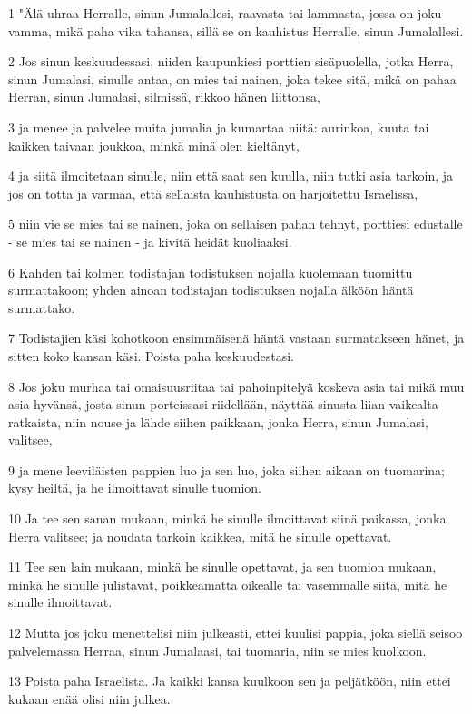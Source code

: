 \par 1 "Älä uhraa Herralle, sinun Jumalallesi, raavasta tai lammasta, jossa on joku vamma, mikä paha vika tahansa, sillä se on kauhistus Herralle, sinun Jumalallesi.
\par 2 Jos sinun keskuudessasi, niiden kaupunkiesi porttien sisäpuolella, jotka Herra, sinun Jumalasi, sinulle antaa, on mies tai nainen, joka tekee sitä, mikä on pahaa Herran, sinun Jumalasi, silmissä, rikkoo hänen liittonsa,
\par 3 ja menee ja palvelee muita jumalia ja kumartaa niitä: aurinkoa, kuuta tai kaikkea taivaan joukkoa, minkä minä olen kieltänyt,
\par 4 ja siitä ilmoitetaan sinulle, niin että saat sen kuulla, niin tutki asia tarkoin, ja jos on totta ja varmaa, että sellaista kauhistusta on harjoitettu Israelissa,
\par 5 niin vie se mies tai se nainen, joka on sellaisen pahan tehnyt, porttiesi edustalle - se mies tai se nainen - ja kivitä heidät kuoliaaksi.
\par 6 Kahden tai kolmen todistajan todistuksen nojalla kuolemaan tuomittu surmattakoon; yhden ainoan todistajan todistuksen nojalla älköön häntä surmattako.
\par 7 Todistajien käsi kohotkoon ensimmäisenä häntä vastaan surmatakseen hänet, ja sitten koko kansan käsi. Poista paha keskuudestasi.
\par 8 Jos joku murhaa tai omaisuusriitaa tai pahoinpitelyä koskeva asia tai mikä muu asia hyvänsä, josta sinun porteissasi riidellään, näyttää sinusta liian vaikealta ratkaista, niin nouse ja lähde siihen paikkaan, jonka Herra, sinun Jumalasi, valitsee,
\par 9 ja mene leeviläisten pappien luo ja sen luo, joka siihen aikaan on tuomarina; kysy heiltä, ja he ilmoittavat sinulle tuomion.
\par 10 Ja tee sen sanan mukaan, minkä he sinulle ilmoittavat siinä paikassa, jonka Herra valitsee; ja noudata tarkoin kaikkea, mitä he sinulle opettavat.
\par 11 Tee sen lain mukaan, minkä he sinulle opettavat, ja sen tuomion mukaan, minkä he sinulle julistavat, poikkeamatta oikealle tai vasemmalle siitä, mitä he sinulle ilmoittavat.
\par 12 Mutta jos joku menettelisi niin julkeasti, ettei kuulisi pappia, joka siellä seisoo palvelemassa Herraa, sinun Jumalaasi, tai tuomaria, niin se mies kuolkoon.
\par 13 Poista paha Israelista. Ja kaikki kansa kuulkoon sen ja peljätköön, niin ettei kukaan enää olisi niin julkea.
